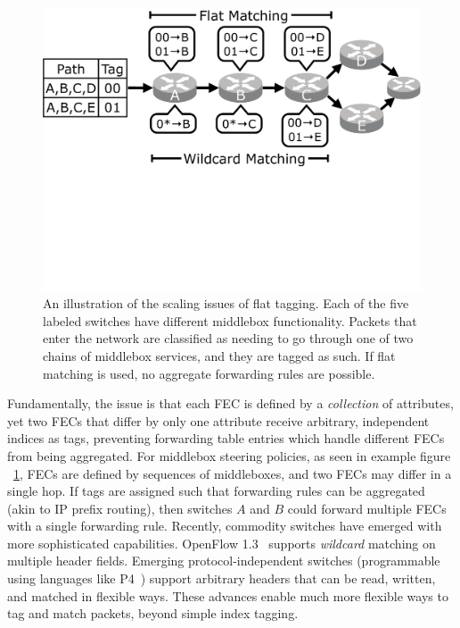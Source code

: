 \begin{figure}[t!] 
\begin{minipage}{1\linewidth}
\includegraphics[trim={0 11.5cm 0 0}, clip, width=\linewidth]{figures/mbox_path_example}
\end{minipage} 
\caption{An illustration of the scaling issues of flat tagging. Each of the five labeled switches have different middlebox functionality. Packets that enter the network are classified as needing to go through one of two chains of middlebox services, and they are tagged as such. If flat matching is used, no aggregate forwarding rules are possible.  }
\label{fig:mbox_path}
\end{figure}
Fundamentally, the issue is that each FEC is defined by a \emph{collection} of attributes, yet two FECs that differ by only one attribute receive arbitrary, independent indices as tags, preventing forwarding table entries which handle different FECs from being aggregated. For middlebox steering policies, as seen in example figure ~\ref{fig:mbox_path}, FECs are defined by sequences of middleboxes, and two FECs may differ in a single hop.  If tags are assigned such that forwarding rules can be aggregated (akin to IP prefix routing), then switches $A$ and $B$ could forward multiple FECs with a single forwarding rule.
Recently, commodity switches have emerged with more sophisticated capabilities.  OpenFlow 1.3~\cite{of13} supports \emph{wildcard} matching on multiple header fields. Emerging protocol-independent switches (programmable using languages like P4~\cite{P4}) support arbitrary headers that can be read, written, and matched in flexible ways.  These advances enable much more flexible ways to tag and match packets, beyond simple index tagging. 

